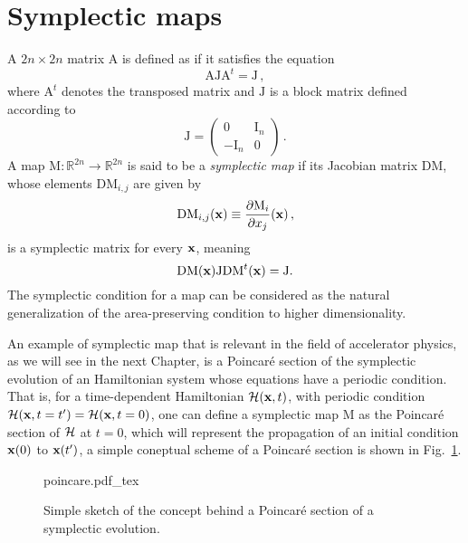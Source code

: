 \section{Symplectic maps}

A $2n \times 2n$ matrix $\mathrm{A}$ is defined as  if it satisfies the equation
\begin{equation}
    \mathrm{A} \mathrm{J} \mathrm{A}^t=\mathrm{J} \,,
\end{equation}
where $\mathrm{A}^t$ denotes the transposed matrix and $\mathrm{J}$ is a block matrix defined according to
\begin{equation}
    \mathrm{J}=\left(\begin{array}{cc}
        0 & \mathrm{I}_n \\
        -\mathrm{I}_n & 0 
    \end{array}\right) \,.
\end{equation}
A map $\mathrm{M}: \mathbb{R}^{2n} \rightarrow \mathbb{R}^{2n}$ is said to be a \textit{symplectic map} if its Jacobian matrix $\mathrm{DM}$, whose elements $\mathrm{DM}_{i, j}$ are given by
\begin{equation}
    \mathrm{DM}_{i, j}(\vb{x}) \equiv \frac{\partial \mathrm{M}_i}{\partial x_j}(\vb{x}) \,,
\end{equation}
is a symplectic matrix for every $\vb{x}$, meaning
\begin{equation}
    \mathrm{DM}(\vb{x}) \mathrm{J} \mathrm{DM}^t(\vb{x})=\mathrm{J} .
\end{equation}
The symplectic condition for a map can be considered as the natural generalization of
the area-preserving condition to higher dimensionality.

An example of symplectic map that is relevant in the field of accelerator physics,  as we will see in the next Chapter, is a Poincaré section of the symplectic evolution of an Hamiltonian system whose equations have a periodic condition. That is, for a time-dependent Hamiltonian $\mathcal{H}(\vb{x}, t)$, with periodic condition $\mathcal{H}(\vb{x}, t=t') = \mathcal{H}(\vb{x}, t=0)$, one can define a symplectic map $\mathrm{M}$ as the Poincaré section of $\mathcal{H}$ at $t=0$, which will represent the propagation of an initial condition $\vb{x}(0)$ to $\vb{x}(t')$, a simple coneptual scheme of a Poincaré section is shown in Fig.~\ref{fig:poincare}. 

\begin{figure}
	\centering
	\def\svgwidth{0.5\columnwidth}
    {poincare.pdf_tex}
    \caption{Simple sketch of the concept behind a Poincaré section of a symplectic evolution.}
    \label{fig:poincare}
\end{figure}

